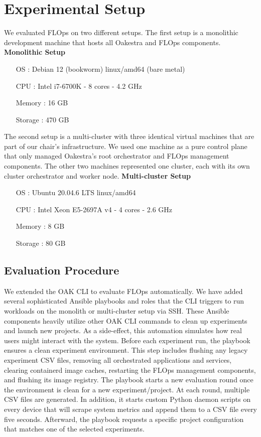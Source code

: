 \section{Experimental Setup}

We evaluated FLOps on two different setups.
The first setup is a monolithic development machine that hosts all Oakestra and FLOps components.
\vspace{5mm}
\newline
\textbf{Monolithic Setup}
\begin{itemize}
    \item [OS]: Debian 12 (bookworm) linux/amd64 (bare metal)
    \item [CPU]: Intel i7-6700K - 8 cores - 4.2 GHz
    \item [Memory]: 16 GB
    \item [Storage]: 470 GB
\end{itemize}

The second setup is a multi-cluster with three identical virtual machines that are part of our chair's infrastructure.
We used one machine as a pure control plane that only managed Oakestra's root orchestrator and FLOps management components.
The other two machines represented one cluster, each with its own cluster orchestrator and worker node.
\vspace{5mm}
\newline
\textbf{Multi-cluster Setup}
\begin{itemize}
    \item [OS]: Ubuntu 20.04.6 LTS linux/amd64
    \item [CPU]: Intel Xeon E5-2697A v4 - 4 cores - 2.6 GHz 
    \item [Memory]: 8 GB
    \item [Storage]: 80 GB
\end{itemize}

\subsection{Evaluation Procedure}

We extended the OAK CLI to evaluate FLOps automatically.
We have added several sophisticated Ansible playbooks and roles that the CLI triggers to run workloads on the monolith or multi-cluster setup via SSH.
These Ansible components heavily utilize other OAK CLI commands to clean up experiments and launch new projects.
As a side-effect, this automation simulates how real users might interact with the system.
Before each experiment run, the playbook ensures a clean experiment environment.
This step includes flushing any legacy experiment CSV files, removing all orchestrated applications and services, clearing containerd image caches, restarting the FLOps management components, and flushing its image registry.
The playbook starts a new evaluation round once the environment is clean for a new experiment/project.
At each round, multiple CSV files are generated.
In addition, it starts custom Python daemon scripts on every device that will scrape system metrics and append them to a CSV file every five seconds.
Afterward, the playbook requests a specific project configuration that matches one of the selected experiments.

